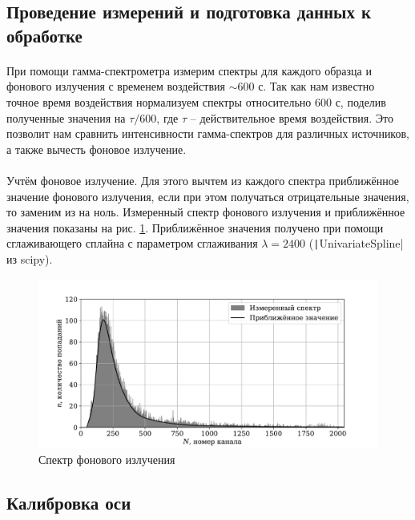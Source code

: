 \documentclass[a4paper,12pt]{article} %
\begin{document}
\subsection{Проведение измерений и подготовка данных к обработке}

\paragraph{}При помощи гамма-спектрометра измерим спектры для каждого образца и фонового излучения с временем воздействия $\sim 600$ с. Так как нам известно точное время воздействия нормализуем спектры относительно $600$ с, поделив полученные значения на $\tau / 600$, где $\tau$ -- действительное время воздействия. Это позволит нам сравнить интенсивности гамма-спектров для различных источников, а также вычесть фоновое излучение.

\paragraph{}Учтём фоновое излучение. Для этого вычтем из каждого спектра приближённое значение фонового излучения, если при этом получаться отрицательные значения, то заменим из на ноль. Измеренный спектр фонового излучения и приближённое значения показаны на рис. \ref{fig:bg}. Приближённое значения получено при помощи сглаживающего сплайна с параметром сглаживания $\lambda = 2400$ (\texttt|UnivariateSpline| из scipy).

\begin{figure}[h]
\centering
\includegraphics[width=\textwidth]{spectrum_bg.pdf}
\caption{Спектр фонового излучения}
\label{fig:bg}
\end{figure}

\subsection{Калибровка оси}
\end{document}
